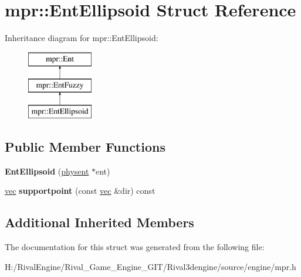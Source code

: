\hypertarget{structmpr_1_1_ent_ellipsoid}{}\section{mpr\+:\+:Ent\+Ellipsoid Struct Reference}
\label{structmpr_1_1_ent_ellipsoid}
Inheritance diagram for mpr\+:\+:Ent\+Ellipsoid\+:\begin{figure}[H]
\begin{center}
\leavevmode
\includegraphics[height=3.000000cm]{structmpr_1_1_ent_ellipsoid}
\end{center}
\end{figure}
\subsection*{Public Member Functions}
\begin{DoxyCompactItemize}
\item 
\mbox{\label{structmpr_1_1_ent_ellipsoid_a2189ddd0bfa43e49c2a1c1d6ef55f6d1}} 
{\bfseries Ent\+Ellipsoid} (\hyperlink{structphysent}{physent} $\ast$ent)
\item 
\mbox{\label{structmpr_1_1_ent_ellipsoid_a6ff3f1827252adbb10d25f8cee4c9861}} 
\hyperlink{structvec}{vec} {\bfseries supportpoint} (const \hyperlink{structvec}{vec} \&dir) const
\end{DoxyCompactItemize}
\subsection*{Additional Inherited Members}


The documentation for this struct was generated from the following file\+:\begin{DoxyCompactItemize}
\item 
H\+:/\+Rival\+Engine/\+Rival\+\_\+\+Game\+\_\+\+Engine\+\_\+\+G\+I\+T/\+Rival3dengine/source/engine/mpr.\+h\end{DoxyCompactItemize}

